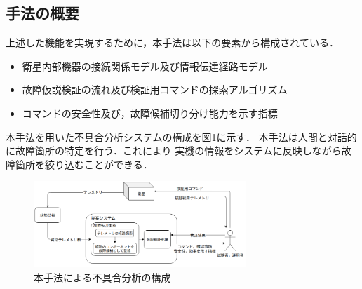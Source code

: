 \documentclass[11pt]{jsarticle}%
\begin{document}
\begin{multicols}{2}
\subsection{手法の概要}
\vspace{-1zh}
上述した機能を実現するために，本手法は以下の要素から構成されている．
\begin{itemize} %
  \item 衛星内部機器の接続関係モデル及び情報伝達経路モデル
  \item 故障仮説検証の流れ及び検証用コマンドの探索アルゴリズム%
  \item コマンドの安全性及び，故障候補切り分け能力を示す指標
\end{itemize}
本手法を用いた不具合分析システムの構成を図\ref{fig:whole_flow}に示す．
本手法は人間と対話的に故障箇所の特定を行う．これにより %
実機の情報をシステムに反映しながら故障箇所を絞り込むことができる．

\begin{figure}[H]
  \centering
    \includegraphics[width=8.0cm]{../figure/whole_flow.png}
    \caption{本手法による不具合分析の構成}
    \label{fig:whole_flow}
\end{figure}


\end{multicols}
\end{document}
